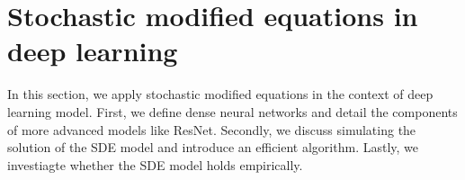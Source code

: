 \documentclass[12pt]{article}
\theoremstyle{definition}
\numberwithin{equation}{section}
\begin{document}

\section{Stochastic modified equations in deep learning}
\label{sec:smdedl}
In this section, we apply stochastic modified equations in the context of deep learning model. First, we define dense neural networks and detail the components of more advanced models like ResNet. Secondly, we discuss simulating the solution of the SDE model and introduce an efficient algorithm. Lastly, we investiagte whether the SDE model holds empirically.
\end{document}
